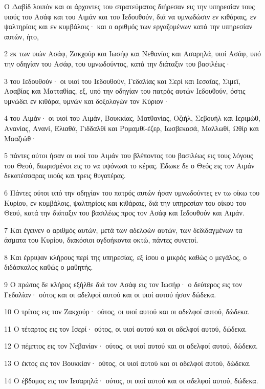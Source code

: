 \par Ο Δαβίδ λοιπόν και οι άρχοντες του στρατεύματος διήρεσαν εις την υπηρεσίαν τους υιούς του Ασάφ και του Αιμάν και του Ιεδουθούν, διά να υμνωδώσιν εν κιθάραις, εν ψαλτηρίοις και εν κυμβάλοις· και ο αριθμός των εργαζομένων κατά την υπηρεσίαν αυτών, ήτο,
\par 2 εκ των υιών Ασάφ, Ζακχούρ και Ιωσήφ και Νεθανίας και Ασαρηλά, υιοί Ασάφ, υπό την οδηγίαν του Ασάφ, του υμνωδούντος, κατά την διάταξιν του βασιλέως·
\par 3 του Ιεδουθούν· οι υιοί του Ιεδουθούν, Γεδαλίας και Σερί και Ιεσαΐας, Σιμεΐ, Ασαβίας και Ματταθίας, εξ, υπό την οδηγίαν του πατρός αυτών Ιεδουθούν, όστις υμνώδει εν κιθάρα, υμνών και δοξολογών τον Κύριον·
\par 4 του Αιμάν· οι υιοί του Αιμάν, Βουκκίας, Ματθανίας, Οζιήλ, Σεβουήλ και Ιεριμώθ, Ανανίας, Ανανί, Ελιαθά, Γιδδαλθί και Ρομαμθί-έζερ, Ιωσβεκασά, Μαλλωθί, Ωθίρ και Μααζιώθ·
\par 5 πάντες ούτοι ήσαν οι υιοί του Αιμάν του βλέποντος του βασιλέως εις τους λόγους του Θεού, διωρισμένοι εις το να υψόνωσι το κέρας. Έδωκε δε ο Θεός εις τον Αιμάν δεκατέσσαρας υιούς και τρεις θυγατέρας.
\par 6 Πάντες ούτοι υπό την οδηγίαν του πατρός αυτών ήσαν υμνωδούντες εν τω οίκω του Κυρίου, εν κυμβάλοις, ψαλτηρίοις και κιθάραις, διά την υπηρεσίαν του οίκου του Θεού, κατά την διάταξιν του βασιλέως προς τον Ασάφ και Ιεδουθούν και Αιμάν.
\par 7 Και έγεινεν ο αριθμός αυτών, μετά των αδελφών αυτών, των δεδιδαγμένων τα άσματα του Κυρίου, διακόσιοι ογδοήκοντα οκτώ, πάντες συνετοί.
\par 8 Και έρριψαν κλήρους περί της υπηρεσίας, εξ ίσου ο μικρός καθώς ο μεγάλος, ο διδάσκαλος καθώς ο μαθητής.
\par 9 Ο πρώτος δε κλήρος εξήλθε διά τον Ασάφ εις τον Ιωσήφ· ο δεύτερος εις τον Γεδαλίαν· ούτος και οι αδελφοί αυτού και οι υιοί αυτού ήσαν δώδεκα.
\par 10 Ο τρίτος εις τον Ζακχούρ· ούτος, οι υιοί αυτού και οι αδελφοί αυτού, δώδεκα.
\par 11 Ο τέταρτος εις τον Ισερί· ούτος, οι υιοί αυτού και οι αδελφοί αυτού, δώδεκα.
\par 12 Ο πέμπτος εις τον Νεβανίαν· ούτος, οι υιοί αυτού και οι αδελφοί αυτού, δώδεκα.
\par 13 Ο έκτος εις τον Βουκκίαν· ούτος, οι υιοί αυτού και οι αδελφοί αυτού, δώδεκα.
\par 14 Ο έβδομος εις τον Ιεσαρηλά· ούτος, οι υιοί αυτού και οι αδελφοί αυτού, δώδεκα.

